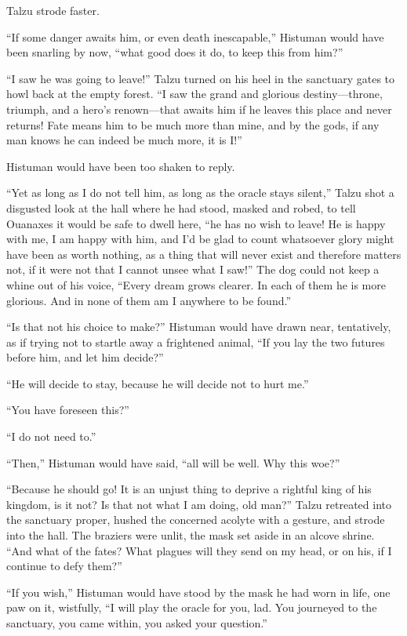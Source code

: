 Talzu strode faster.

``If some danger awaits him, or even death inescapable,'' Histuman would have been snarling by now, ``what good does it do, to keep this from him?''

``I saw he was going to leave!'' Talzu turned on his heel in the sanctuary gates to howl back at the empty forest. ``I saw the grand and glorious destiny---throne, triumph, and a hero's renown---that awaits him if he leaves this place and never returns! Fate means him to be much more than mine, and by the gods, if any man knows he can indeed be much more, it is I!''

Histuman would have been too shaken to reply.

``Yet as long as I do not tell him, as long as the oracle stays silent,'' Talzu shot a disgusted look at the hall where he had stood, masked and robed, to tell Ouanaxes it would be safe to dwell here, ``he has no wish to leave! He is happy with me, I am happy with him, and I'd be glad to count whatsoever glory might have been as worth nothing, as a thing that will never exist and therefore matters not, if it were not that I cannot unsee what I saw!'' The dog could not keep a whine out of his voice, ``Every dream grows clearer. In each of them he is more glorious. And in none of them am I anywhere to be found.''

``Is that not his choice to make?'' Histuman would have drawn near, tentatively, as if trying not to startle away a frightened animal, ``If you lay the two futures before him, and let him decide?''

``He will decide to stay, because he will decide not to hurt me.''

``You have foreseen this?''

``I do not need to.''

``Then,'' Histuman would have said, ``all will be well. Why this woe?''

``Because he should go! It is an unjust thing to deprive a rightful king of his kingdom, is it not? Is that not what I am doing, old man?'' Talzu retreated into the sanctuary proper, hushed the concerned acolyte with a gesture, and strode into the hall. The braziers were unlit, the mask set aside in an alcove shrine. ``And what of the fates? What plagues will they send on my head, or on his, if I continue to defy them?''

``If you wish,'' Histuman would have stood by the mask he had worn in life, one paw on it, wistfully, ``I will play the oracle for you, lad. You journeyed to the sanctuary, you came within, you asked your question.''

